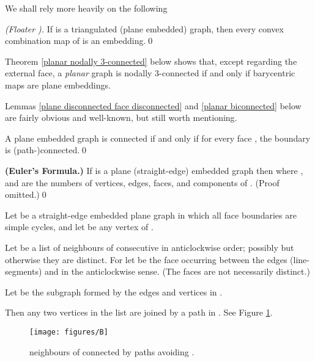 We shall rely more heavily on the following

\begin{proposition}
\label{floaters theorem} {\em (Floater \cite{floater03}).}
If  is a triangulated (plane embedded) graph, then every convex
combination map of  is an embedding.\qed
\end{proposition}

Theorem \ref{planar nodally 3-connected} below shows that,
except regarding the external face, a {\em planar} graph
is nodally 3-connected if and only if barycentric maps
are plane embeddings.



Lemmas
\ref{plane disconnected face disconnected} and
\ref{planar biconnected} below are fairly obvious
and well-known, but still worth mentioning.

\begin{lemma}
\label{plane disconnected face disconnected} A plane embedded graph  is
connected if and only if for every face ,
the boundary  is (path-)connected.\qed
\end{lemma}




\begin{proposition}
\label{eulers formula} {\bf (Euler's Formula.)}
If  is a plane (straight-edge) embedded graph
then 
 where , and  are the
numbers of vertices, edges, faces, and components
of . (Proof omitted.)\qed
\end{proposition}

\begin{lemma}
\label{link of u} Let  be a straight-edge embedded plane graph in which all face boundaries
are simple cycles, and let  be any vertex of .

Let  be a list of neighbours of
 consecutive in anticlockwise order; possibly 
but otherwise they are distinct.  For 
let  be the face occurring between the edges (line-segments)
 and  in the anticlockwise sense.  (The
faces  are not necessarily distinct.)

Let  be the subgraph formed by the edges and vertices
in .

Then any two vertices in the list  are joined by a path in
. See Figure \ref{B.fig}.
\end{lemma}

\begin{figure}
\centerline{\texttt{[image: figures/B]}}
\caption{neighbours of  connected by paths avoiding .}
\label{B.fig}
\end{figure}

